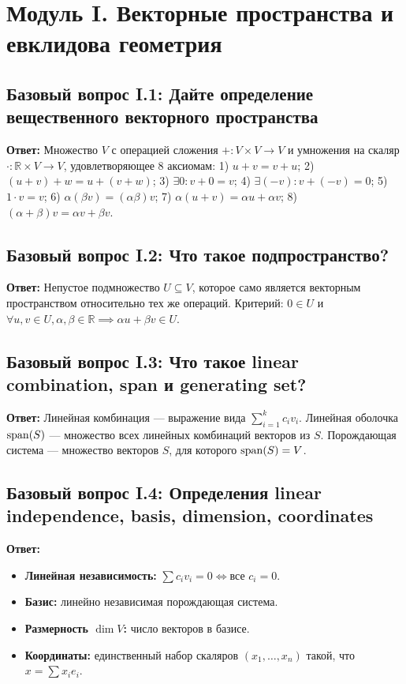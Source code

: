 \section{Модуль I. Векторные пространства и евклидова геометрия}

\subsection{Базовый вопрос I.1: Дайте определение вещественного векторного пространства}
\textbf{Ответ:} Множество $V$ с операцией сложения $+ \colon V \times V \to V$ и умножения на скаляр $\cdot \colon
\mathbb{R} \times V \to V$, удовлетворяющее 8 аксиомам: 1) $u+v = v+u$; 2) $(u+v)+w = u+(v+w)$; 3) $\exists 0 \colon
v+0=v$; 4) $\exists (-v) \colon v+(-v)=0$; 5) $1 \cdot v = v$; 6) $\alpha(\beta v) = (\alpha\beta)v$; 7) $\alpha(u+v) =
\alpha u + \alpha v$; 8) $(\alpha+\beta)v = \alpha v + \beta v$.

\subsection{Базовый вопрос I.2: Что такое подпространство?}
\textbf{Ответ:} Непустое подмножество $U \subseteq V$, которое само является векторным пространством относительно тех же
операций.
Критерий: $0 \in U$ и $\forall u, v \in U, \alpha, \beta \in \mathbb{R} \implies \alpha u + \beta v \in U$.

\subsection{Базовый вопрос I.3: Что такое linear combination, span и generating set?}
\textbf{Ответ:} Линейная комбинация — выражение вида $\sum_{i=1}^k c_i v_i$.
Линейная оболочка $\operatorname{span}(S)$ — множество всех линейных комбинаций векторов из $S$.
Порождающая система — множество векторов $S$, для которого $\operatorname{span}(S) = V$.

\subsection{Базовый вопрос I.4: Определения linear independence, basis, dimension, coordinates}
\textbf{Ответ:}
\begin{itemize}
    \item \textbf{Линейная независимость:} $\sum c_i v_i = 0 \iff \text{все } c_i = 0$.
    \item \textbf{Базис:} линейно независимая порождающая система.
    \item \textbf{Размерность $\dim V$:} число векторов в базисе.
    \item \textbf{Координаты:} единственный набор скаляров $(x_1, \dots, x_n)$ такой, что $x = \sum x_i e_i$.
\end{itemize}

